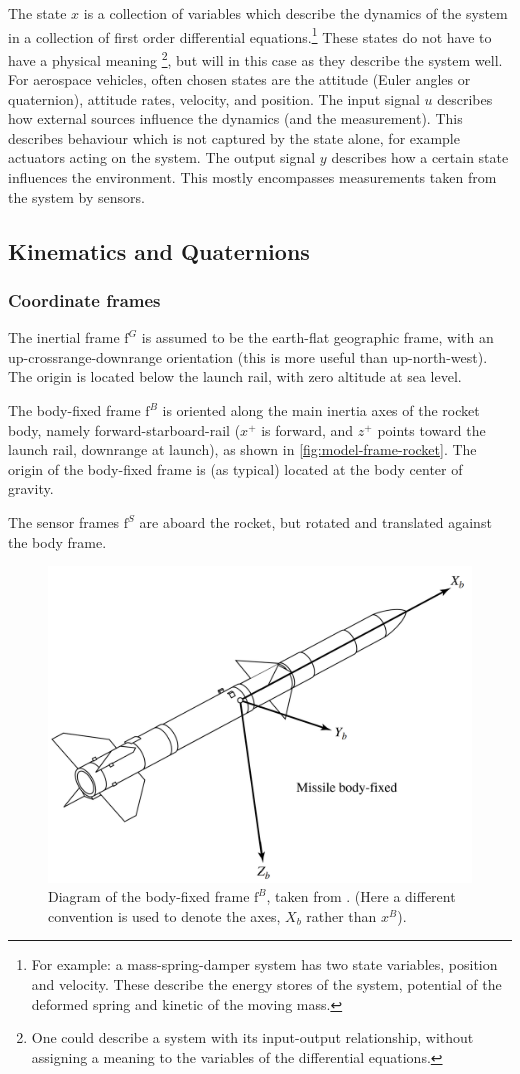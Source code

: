 The state $x$ is a collection of variables which describe the dynamics of the system in a collection of first order differential equations.\footnote{For example: a mass-spring-damper system has two state variables, position and velocity. These describe the energy stores of the system, potential of the deformed spring and kinetic of the moving mass.}
These states do not have to have a physical meaning \footnote{One could describe a system with its input-output relationship, without assigning a meaning to the variables of the differential equations.}, but will in this case as they describe the system well.
For aerospace vehicles, often chosen states are the attitude (Euler angles or quaternion), attitude rates, velocity, and position. 
The input signal $u$ describes how external sources influence the dynamics (and the measurement). 
This describes behaviour which is not captured by the state alone, for example actuators acting on the system.
The output signal $y$ describes how a certain state influences the environment.
This mostly encompasses measurements taken from the system by sensors.


\subsection{Kinematics and Quaternions}
\subsubsection{Coordinate frames}

The inertial frame $\mathrm{f}^G$ is assumed to be the earth-flat geographic frame, with an up-crossrange-downrange orientation (this is more useful than up-north-west).
The origin is located below the launch rail, with zero altitude at sea level.

The body-fixed frame $\mathrm{f}^B$ is oriented along the main inertia axes of the rocket body, namely forward-starboard-rail ($x^+$ is forward, and $z^+$ points toward the launch rail, downrange at launch), as shown in \autoref{fig:model-frame-rocket}.
The origin of the body-fixed frame is (as typical) located at the body center of gravity.

The sensor frames $\mathrm{f}^{S}$ are aboard the rocket, but rotated and translated against the body frame.

\begin{figure}[ht]
    \centering
    \includegraphics[width=0.45\linewidth]{images-design/model-coordinates-rocket.png}
    \caption[Diagram of the body-fixed frame $\mathrm{f}^B$]{Diagram of the body-fixed frame $\mathrm{f}^B$, taken from \cite{siouris2004}. (Here a different convention is used to denote the axes, $X_b$ rather than $x^B$). }
    \label{fig:model-frame-rocket}
\end{figure}

